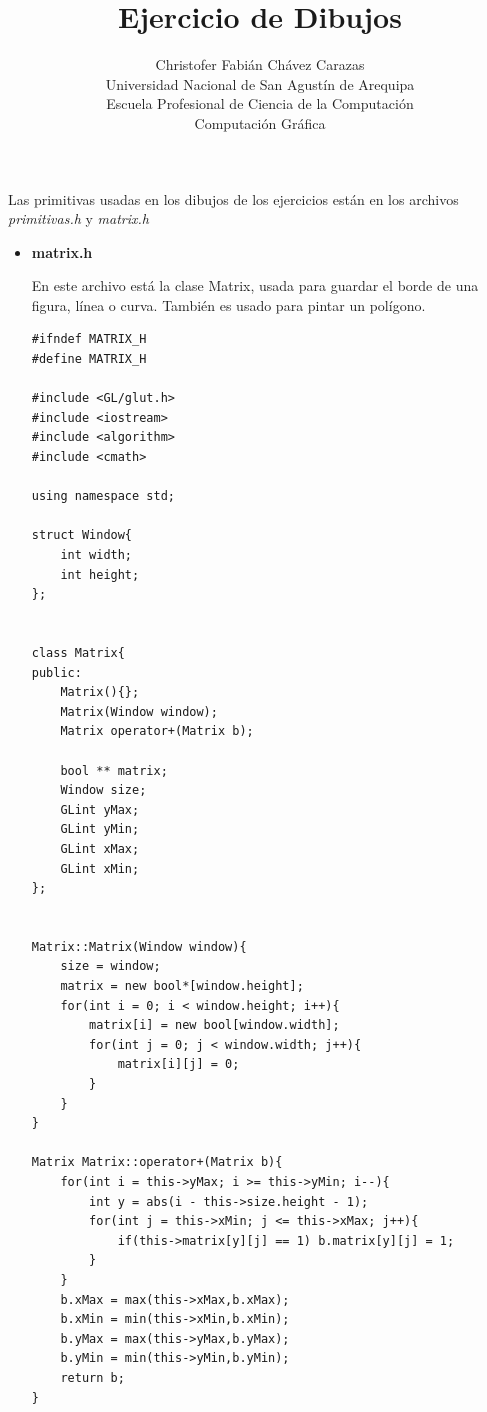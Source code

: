 \documentclass[a4paper,12pt]{article}
\begin{document}
\title{Ejercicio de Dibujos}
\author{
Christofer Fabián Chávez Carazas \\
\small{Universidad Nacional de San Agustín de Arequipa} \\
\small{Escuela Profesional de Ciencia de la Computación} \\
\small{Computación Gráfica}
}
\date{}

\maketitle

Las primitivas usadas en los dibujos de los ejercicios están en los archivos \textit{primitivas.h} y \textit{matrix.h}

\begin{itemize}
 \item \textbf{matrix.h}
 
 En este archivo está la clase Matrix, usada para guardar el borde de una figura, línea o curva. También es usado para pintar un polígono.
 
 \begin{lstlisting}
#ifndef MATRIX_H
#define MATRIX_H

#include <GL/glut.h>
#include <iostream>
#include <algorithm>
#include <cmath>

using namespace std;

struct Window{
    int width;
    int height;
};


class Matrix{
public:
    Matrix(){};
    Matrix(Window window);
    Matrix operator+(Matrix b);

    bool ** matrix;
    Window size;
    GLint yMax;
    GLint yMin;
    GLint xMax;
    GLint xMin;
};


Matrix::Matrix(Window window){
    size = window;
    matrix = new bool*[window.height];
    for(int i = 0; i < window.height; i++){
        matrix[i] = new bool[window.width];
        for(int j = 0; j < window.width; j++){
            matrix[i][j] = 0;
        }
    }
}

Matrix Matrix::operator+(Matrix b){
    for(int i = this->yMax; i >= this->yMin; i--){
        int y = abs(i - this->size.height - 1);
        for(int j = this->xMin; j <= this->xMax; j++){
            if(this->matrix[y][j] == 1) b.matrix[y][j] = 1;
        }
    }
    b.xMax = max(this->xMax,b.xMax);
    b.xMin = min(this->xMin,b.xMin);
    b.yMax = max(this->yMax,b.yMax);
    b.yMin = min(this->yMin,b.yMin);
    return b;
}


\end{lstlisting}
\end{itemize}
\end{document}
